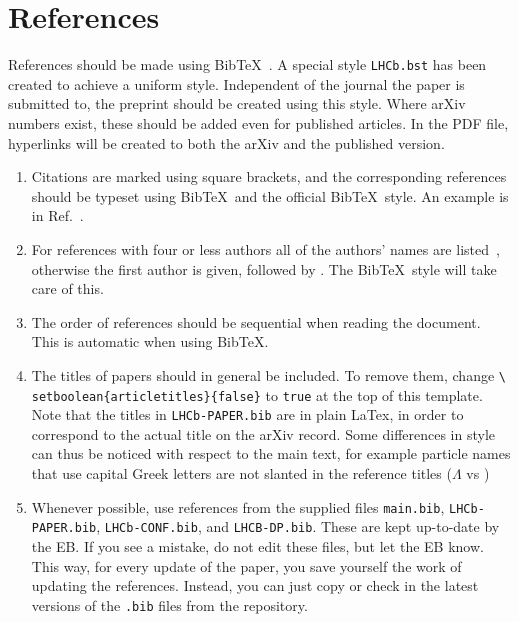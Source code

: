 \section{References}
\label{sec:References}

References should be made using Bib\TeX~\cite{BibTeX}. A special style
\texttt{LHCb.bst} has been created to achieve a uniform
style. Independent of the journal the paper is submitted to, the
preprint should be created using this style. Where arXiv numbers
exist, these should be added even for published articles. In the PDF
file, hyperlinks will be created to both the arXiv and the published
version.

\begin{enumerate}

\item Citations are marked using square brackets, and the
  corresponding references should be typeset using Bib\TeX\ and the
  official \lhcb Bib\TeX\ style. An example is in
  Ref.~\cite{Sjostrand:2006za}.

\item For references with four or less authors all of the authors'
  names are listed~\cite{Majorana:1937vz}, otherwise the first author
  is given, followed by \etal. The \lhcb Bib\TeX\ style will
  take care of this.

\item The order of references should be sequential when reading the
  document. This is automatic when using Bib\TeX.

\item The titles of papers should in general be included. To remove
  them, change \texttt{\textbackslash
    setboolean\{articletitles\}\{false\}} to \texttt{true} at the top
  of this template.
  Note that the titles in \verb!LHCb-PAPER.bib! are in plain LaTex,
  in order to correspond to the actual title on the arXiv record.
  Some differences in style can thus be noticed with respect to the
  main text, for example particle names that use capital Greek letters
  are not slanted in the reference titles ($\Lambda$ vs \Lz)  

\item Whenever possible, use references from the supplied files
\verb!main.bib!, \verb!LHCb-PAPER.bib!, \verb!LHCb-CONF.bib!, and \verb!LHCB-DP.bib!.
These are kept up-to-date by the EB. If you see a mistake, do not edit these files,
but let the EB know. This way, for every update of the paper, you save
yourself the work of updating the references. Instead, you can just copy or
check in the latest versions of the \verb!.bib! files from the repository.   


\end{enumerate}

